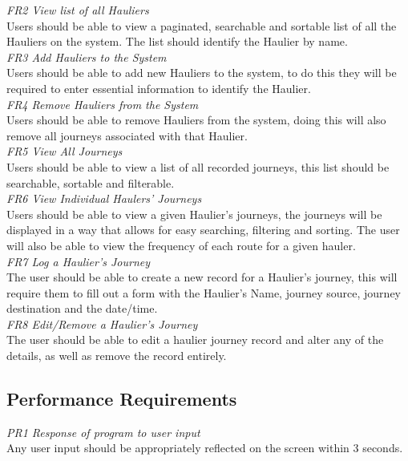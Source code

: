 \documentclass{project}
\begin{document}
\textit{FR2 View list of all Hauliers}\\
Users should be able to view a paginated, searchable and sortable list of all the Hauliers on the system. The list should identify the Haulier by name.\\

\textit{FR3 Add Hauliers to the System}\\
Users should be able to add new Hauliers to the system, to do this they will be required to enter essential information to identify the Haulier.\\

\textit{FR4 Remove Hauliers from the System}\\
Users should be able to remove Hauliers from the system, doing this will also remove all journeys associated with that Haulier.\\

\textit{FR5 View All Journeys}\\
Users should be able to view a list of all recorded journeys, this list should be searchable, sortable and filterable.\\

\textit{FR6 View Individual Haulers' Journeys}\\
Users should be able to view a given Haulier's journeys, the journeys will be displayed in a way that allows for easy searching, filtering and sorting. The user will also be able to view the frequency of each route for a given hauler.\\

\textit{FR7 Log a Haulier's Journey}\\
The user should be able to create a new record for a Haulier's journey, this will require them to fill out a form with the Haulier's Name, journey source, journey destination and the date/time.\\

\textit{FR8 Edit/Remove a Haulier's Journey}\\
The user should be able to edit a haulier journey record and alter any of the details, as well as remove the record entirely.\\

\subsection{Performance Requirements}
\textit{PR1 Response of program to user input}\\
Any user input should be appropriately reflected on the screen within 3 seconds.\\
\end{document}
